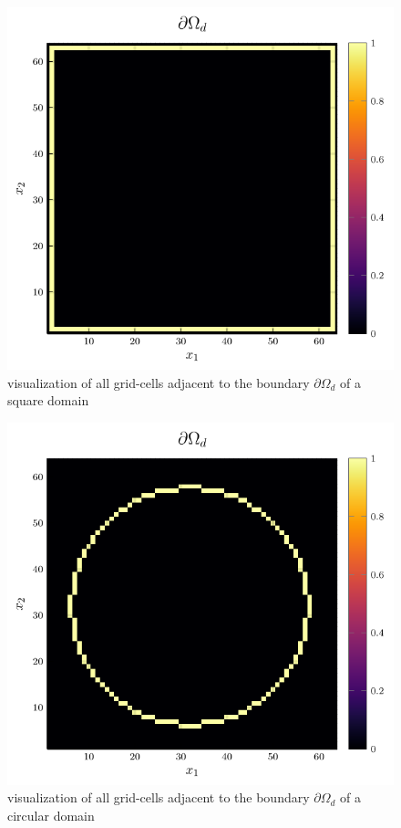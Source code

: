 \documentclass{mimosis}
\begin{document}
\begin{figure}[htbp]
\centering
\includegraphics[width=.9\linewidth]{images/boundary.png}
\caption{\label{fig:boundary-square}visualization of all grid-cells adjacent to the boundary \(\partial \Omega_{d}\) of a square domain}
\end{figure}

\begin{figure}[htbp]
\centering
\includegraphics[width=.9\linewidth]{images/boundary-circle.png}
\caption{\label{fig:boundary-circle}visualization of all grid-cells adjacent to the boundary \(\partial \Omega_{d}\) of a circular domain}
\end{figure}
\end{document}
